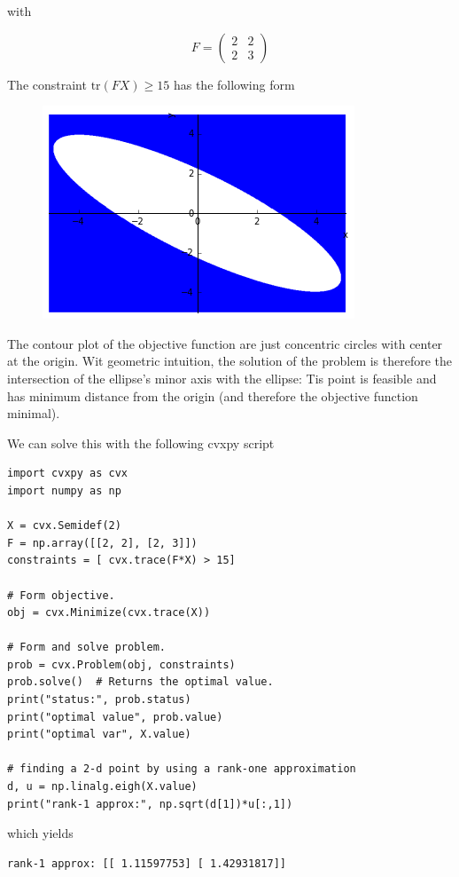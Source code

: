 with

\[
F = \begin{pmatrix} 2 & 2 \\ 2 & 3 \end{pmatrix}
\]

The constraint $\text{tr}(F X) \geq 15$ has the following form

\begin{figure}
\centering
\includegraphics{images/sdr_2.png}
\end{figure}

The contour plot of the objective function are just concentric circles with center at the origin. Wit geometric intuition, the solution of the problem is therefore the intersection of the ellipse's minor axis with the ellipse: Tis point is feasible and has minimum distance from the origin (and therefore the objective function minimal).

We can solve this with the following cvxpy script

\begin{verbatim}
import cvxpy as cvx
import numpy as np

X = cvx.Semidef(2)
F = np.array([[2, 2], [2, 3]])
constraints = [ cvx.trace(F*X) > 15]

# Form objective.
obj = cvx.Minimize(cvx.trace(X))

# Form and solve problem.
prob = cvx.Problem(obj, constraints)
prob.solve()  # Returns the optimal value.
print("status:", prob.status)
print("optimal value", prob.value)
print("optimal var", X.value)

# finding a 2-d point by using a rank-one approximation
d, u = np.linalg.eigh(X.value)
print("rank-1 approx:", np.sqrt(d[1])*u[:,1])
\end{verbatim}

which yields

\begin{verbatim}
rank-1 approx: [[ 1.11597753] [ 1.42931817]]
\end{verbatim}

